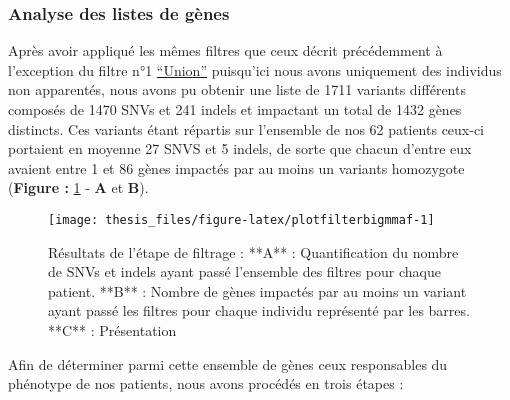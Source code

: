\documentclass[12pt,twoside]{reedthesis}
\theoremstyle{definition}
\theoremstyle{definition}
\theoremstyle{remark}
\begin{document}
  \newpage
  
  \subsubsection{Analyse des listes de
  gènes}\label{analyse-des-listes-de-genes}
  
  Après avoir appliqué les mêmes filtres que ceux décrit précédemment à
  l'exception du filtre n°1
  \protect\hyperlink{filterdescription}{``Union''} puisqu'ici nous avons
  uniquement des individus non apparentés, nous avons pu obtenir une liste
  de 1711 variants différents composés de 1470 SNVs et 241 indels et
  impactant un total de 1432 gènes distincts. Ces variants étant répartis
  sur l'ensemble de nos 62 patients ceux-ci portaient en moyenne 27 SNVS
  et 5 indels, de sorte que chacun d'entre eux avaient entre 1 et 86 gènes
  impactés par au moins un variants homozygote (\textbf{Figure :
  }\ref{fig:plotfilterbigmmaf} - \textbf{A} et \textbf{B}).
  
  \begin{figure}
  
  {\centering \texttt{[image: thesis\_files/figure-latex/plotfilterbigmmaf-1]} 
  
  }
  
  \caption[Résultats de l'étape de filtrage]{Résultats de l'étape de filtrage : **A** : Quantification du nombre de SNVs et indels ayant passé l'ensemble des filtres pour chaque patient. **B** : Nombre de gènes impactés par au moins un variant ayant passé les filtres pour chaque individu représenté par les barres. **C** : Présentation }\label{fig:plotfilterbigmmaf}
  \end{figure}
  
  \newpage
  
  Afin de déterminer parmi cette ensemble de gènes ceux responsables du
  phénotype de nos patients, nous avons procédés en trois étapes :
  
\end{document}
